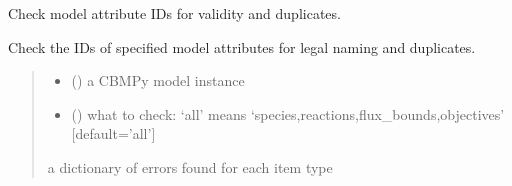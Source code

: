 \documentclass[letterpaper,12pt,english]{sphinxmanual}
\begin{document}

\begin{fulllineitems}
\label{\detokenize{api/core:cbmpy.CBTools.checkIds}}
\pysigstartsignatures
\pysiglinewithargsret
{}
{\sphinxparamcomma {}}
{}
\pysigstopsignatures
\sphinxAtStartPar
Check model attribute IDs for validity and duplicates.

\sphinxAtStartPar
Check the IDs of specified model attributes for legal naming and duplicates.
\begin{quote}\begin{description}
\begin{itemize}
\item {} 
\sphinxAtStartPar
{} () \textendash{} a CBMPy model instance

\item {} 
\sphinxAtStartPar
{} (\sphinxstyleliteralemphasis{\sphinxupquote{, }}) \textendash{} what to check: ‘all’ means ‘species,reactions,flux\_bounds,objectives’ {[}default=’all’{]}

\end{itemize}

\sphinxAtStartPar
{} \textendash{} a dictionary of errors found for each item type

\end{description}\end{quote}

\end{fulllineitems}

\end{document}
